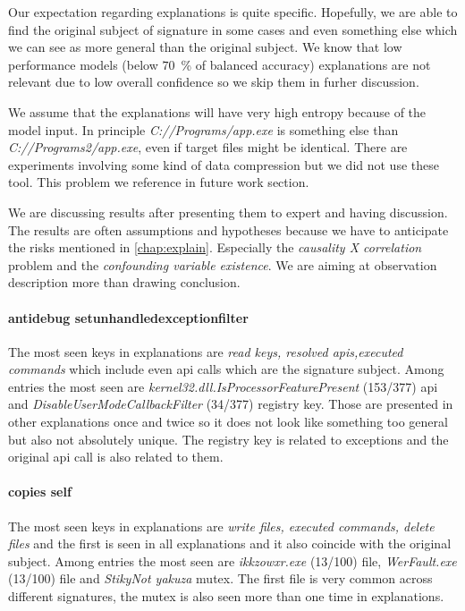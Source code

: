 Our expectation regarding explanations is quite specific. Hopefully, we are able to find the original subject of signature in some cases and even something else which we can see as more general than the original subject. We know that low performance models (below $70$~\% of balanced accuracy) explanations are not relevant due to low overall confidence so we skip them in furher discussion.

We assume that the explanations will have very high entropy because of the model input. In principle \emph{C://Programs/app.exe} is something else than \emph{C://Programs2/app.exe}, even if target files might be identical. There are experiments involving some kind of data compression but we did not use these tool. This problem we reference in future work section. 

We are discussing results after presenting them to expert and having discussion. The results are often assumptions and hypotheses because we have to anticipate the risks mentioned in \ref{chap:explain}. Especially the \emph{causality X correlation} problem and the \emph{confounding variable existence}. We are aiming at observation description more than drawing conclusion.

\paragraph{antidebug setunhandledexceptionfilter}
The most seen keys in explanations are \emph{read keys, resolved apis,executed commands} which include even api calls which are the signature subject. Among entries the most seen are \emph{kernel32.dll.IsProcessorFeaturePresent} (153/377) api and \emph{DisableUserModeCallbackFilter} (34/377) registry key. Those are presented in other explanations once and twice so it does not look like something too general but also not absolutely unique. The registry key is related to exceptions and the original api call is also related to them.

\paragraph{copies self}
The most seen keys in explanations are \emph{write files, executed commands, delete files} and the first is seen in all explanations and it also coincide with the original subject. Among entries the most seen are \emph{ikkzowxr.exe} (13/100) file, \emph{WerFault.exe} (13/100) file and \emph{StikyNot yakuza} mutex. The first file is very common across different signatures, the mutex is also seen more than one time in explanations.

